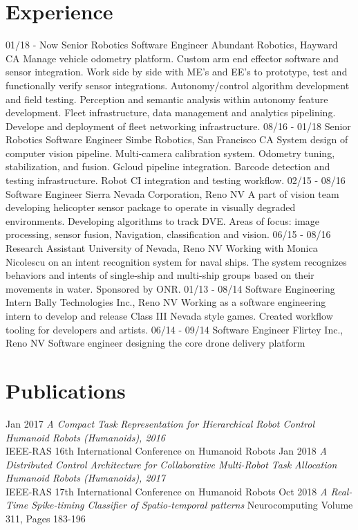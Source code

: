\documentclass[9pt]{friggeri-cv}
\begin{document}
\section{Experience}
\begin{entrylist}
  \entry
    {01/18 - Now}
    {Senior Robotics Software Engineer}
    {Abundant Robotics, Hayward CA}
    {Manage vehicle odometry platform. Custom arm end effector software and sensor integration. Work side by side with ME's and EE's to prototype, test and functionally verify sensor integrations. Autonomy/control algorithm development and field testing. Perception and semantic analysis within autonomy feature development. Fleet infrastructure, data management and analytics pipelining. Develope and deployment of fleet networking infrastructure.}
  \entry
    {08/16 - 01/18}
    {Senior Robotics Software Engineer}
    {Simbe Robotics, San Francisco CA}
    {System design of computer vision pipeline. Multi-camera calibration system. Odometry tuning, stabilization, and fusion. Gcloud pipeline integration. Barcode detection and testing infrastructure. Robot CI integration and testing workflow.}
  \entry
    {02/15 - 08/16}
    {Software Engineer}
    {Sierra Nevada Corporation, Reno NV}
    {A part of vision team developing helicopter sensor package to operate in visually degraded environments. Developing algorithms to track DVE. Areas of focus: image processing, sensor fusion, Navigation, classification and vision.}
  \entry
    {06/15 - 08/16}
    {Research Assistant}
    {University of Nevada, Reno NV}
    {Working with Monica Nicolescu on an intent recognition system for naval ships. The system recognizes behaviors and intents of single-ship and multi-ship groups based on their movements in water. Sponsored by ONR.}
  \entry
    {01/13 - 08/14}
    {Software Engineering Intern}
    {Bally Technologies Inc., Reno NV}
    {Working as a software engineering intern to develop and release Class III Nevada style games. Created workflow tooling for developers and artists.}
  \entry
    {06/14 - 09/14}
    {Software Engineer}
    {Flirtey Inc., Reno NV}
    {Software engineer designing the core drone delivery platform}
\end{entrylist}

\section{Publications}
\begin{entrylist}
  \entry
    {Jan 2017}
    {\emph{A Compact Task Representation for Hierarchical Robot Control}}
    {}
    {\emph{Humanoid Robots (Humanoids), 2016}\\IEEE-RAS 16th International Conference on Humanoid Robots}
  \entry
    {Jan 2018}
    {\emph{A Distributed Control Architecture for Collaborative Multi-Robot Task Allocation}}
    {}
    {\emph{Humanoid Robots (Humanoids), 2017}\\IEEE-RAS 17th International Conference on Humanoid Robots}
  \entry
    {Oct 2018}
    {\emph{A Real-Time Spike-timing Classifier of Spatio-temporal patterns}}
    {}
    {Neurocomputing Volume 311, Pages 183-196}
\end{entrylist}
\end{document}
